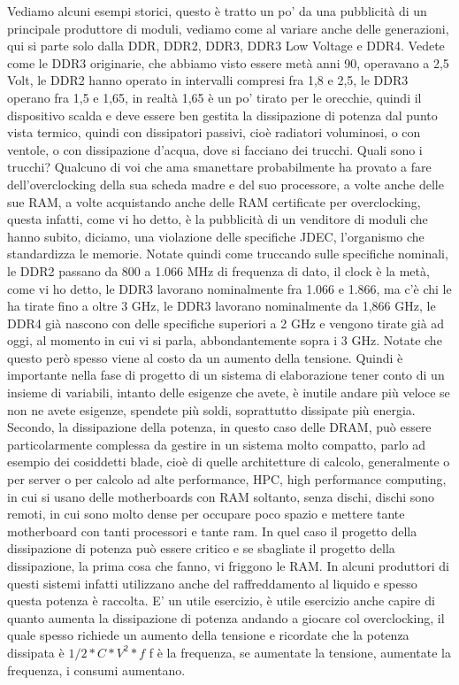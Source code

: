 Vediamo alcuni esempi storici, questo è tratto un po' da una pubblicità di un principale produttore di moduli, vediamo come al variare anche delle generazioni, qui si parte solo dalla DDR, DDR2, DDR3, DDR3 Low Voltage e DDR4.
Vedete come le DDR3 originarie, che abbiamo visto essere metà anni 90, operavano a 2,5 Volt, le DDR2 hanno operato in intervalli compresi fra 1,8 e 2,5, le DDR3 operano fra 1,5 e 1,65, in realtà 1,65 è un po' tirato per le orecchie, quindi il dispositivo scalda e deve essere ben gestita la dissipazione di potenza dal punto vista termico, quindi con dissipatori passivi, cioè radiatori voluminosi, o con ventole, o con dissipazione d'acqua, dove si facciano dei trucchi.
Quali sono i trucchi?
Qualcuno di voi che ama smanettare probabilmente ha provato a fare dell'overclocking della sua scheda madre e del suo processore, a volte anche delle sue RAM, a volte acquistando anche delle RAM certificate per overclocking, questa infatti, come vi ho detto, è la pubblicità di un venditore di moduli che hanno subito, diciamo, una violazione delle specifiche JDEC, l'organismo che standardizza le memorie.
Notate quindi come truccando sulle specifiche nominali, le DDR2 passano da 800 a 1.066 MHz di frequenza di dato, il clock è la metà, come vi ho detto, le DDR3 lavorano nominalmente fra 1.066 e 1.866, ma c'è chi le ha tirate fino a oltre 3 GHz, le DDR3 lavorano nominalmente da 1,866 GHz, le DDR4 già nascono con delle specifiche superiori a 2 GHz e vengono tirate già ad oggi, al momento in cui vi si parla, abbondantemente sopra i 3 GHz.
Notate che questo però spesso viene al costo da un aumento della tensione.
Quindi è importante nella fase di progetto di un sistema di elaborazione tener conto di un insieme di variabili, intanto delle esigenze che avete, è inutile andare più veloce se non ne avete esigenze, spendete più soldi, soprattutto dissipate più energia.
Secondo, la dissipazione della potenza, in questo caso delle DRAM, può essere particolarmente complessa da gestire in un sistema molto compatto, parlo ad esempio dei cosiddetti blade, cioè di quelle architetture di calcolo, generalmente o per server o per calcolo ad alte performance, HPC, high performance computing, in cui si usano delle motherboards con RAM soltanto, senza dischi, dischi sono remoti, in cui sono molto dense per occupare poco spazio e mettere tante motherboard con tanti processori e tante ram.
In quel caso il progetto della dissipazione di potenza può essere critico e se sbagliate il progetto della dissipazione, la prima cosa che fanno, vi friggono le RAM.
In alcuni produttori di questi sistemi infatti utilizzano anche del raffreddamento al liquido e spesso questa potenza è raccolta.
E' un utile esercizio, è utile esercizio anche capire di quanto aumenta la dissipazione di potenza andando a giocare col overclocking, il quale spesso richiede un aumento della tensione e ricordate che la potenza dissipata è $1/2*C*V^2 * f$ f è la frequenza, se aumentate la tensione, aumentate la frequenza, i consumi aumentano.

